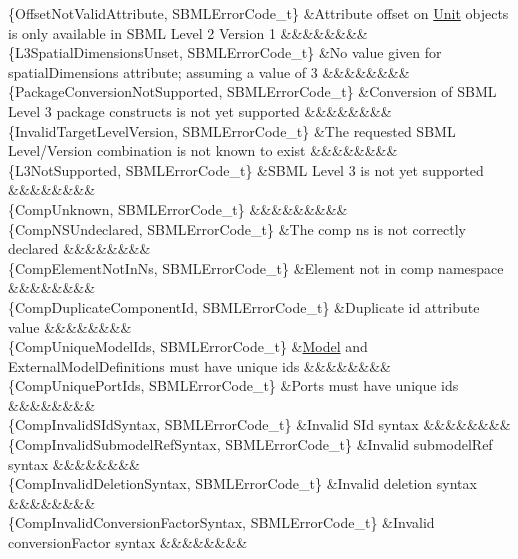 \begin{DoxyParagraph}{}
\begin{longtabu}
\{Offset\+Not\+Valid\+Attribute, S\+B\+M\+L\+Error\+Code\+\_\+t\} &Attribute \textquotesingle{}offset\textquotesingle{} on \hyperlink{class_unit}{Unit} objects is only available in S\+B\+ML Level 2 Version 1 &&&&&&&&\\
\{L3\+Spatial\+Dimensions\+Unset, S\+B\+M\+L\+Error\+Code\+\_\+t\} &No value given for \textquotesingle{}spatial\+Dimensions\textquotesingle{} attribute; assuming a value of 3 &&&&&&&&\\
\{Package\+Conversion\+Not\+Supported, S\+B\+M\+L\+Error\+Code\+\_\+t\} &Conversion of S\+B\+ML Level 3 package constructs is not yet supported &&&&&&&&\\
\{Invalid\+Target\+Level\+Version, S\+B\+M\+L\+Error\+Code\+\_\+t\} &The requested S\+B\+ML Level/\+Version combination is not known to exist &&&&&&&&\\
\{L3\+Not\+Supported, S\+B\+M\+L\+Error\+Code\+\_\+t\} &S\+B\+ML Level 3 is not yet supported &&&&&&&&\\
\{Comp\+Unknown, S\+B\+M\+L\+Error\+Code\+\_\+t\} &&&&&&&&&\\
\{Comp\+N\+S\+Undeclared, S\+B\+M\+L\+Error\+Code\+\_\+t\} &The comp ns is not correctly declared &&&&&&&&\\
\{Comp\+Element\+Not\+In\+Ns, S\+B\+M\+L\+Error\+Code\+\_\+t\} &Element not in comp namespace &&&&&&&&\\
\{Comp\+Duplicate\+Component\+Id, S\+B\+M\+L\+Error\+Code\+\_\+t\} &Duplicate \textquotesingle{}id\textquotesingle{} attribute value &&&&&&&&\\
\{Comp\+Unique\+Model\+Ids, S\+B\+M\+L\+Error\+Code\+\_\+t\} &\hyperlink{class_model}{Model} and External\+Model\+Definitions must have unique ids &&&&&&&&\\
\{Comp\+Unique\+Port\+Ids, S\+B\+M\+L\+Error\+Code\+\_\+t\} &Ports must have unique ids &&&&&&&&\\
\{Comp\+Invalid\+S\+Id\+Syntax, S\+B\+M\+L\+Error\+Code\+\_\+t\} &Invalid S\+Id syntax &&&&&&&&\\
\{Comp\+Invalid\+Submodel\+Ref\+Syntax, S\+B\+M\+L\+Error\+Code\+\_\+t\} &Invalid submodel\+Ref syntax &&&&&&&&\\
\{Comp\+Invalid\+Deletion\+Syntax, S\+B\+M\+L\+Error\+Code\+\_\+t\} &Invalid deletion syntax &&&&&&&&\\
\{Comp\+Invalid\+Conversion\+Factor\+Syntax, S\+B\+M\+L\+Error\+Code\+\_\+t\} &Invalid conversion\+Factor syntax &&&&&&&&\\

\end{longtabu}
\end{DoxyParagraph}
